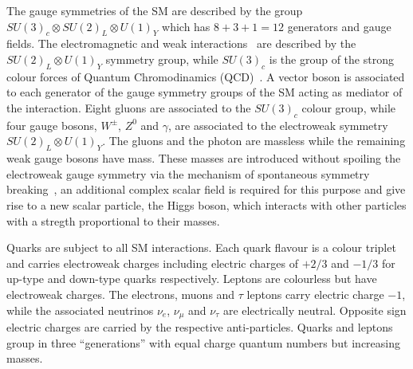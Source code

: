
The gauge  symmetries of the SM are described by the group $SU(3)_c \otimes SU(2)_L \otimes U(1)_Y$ which has $8+3+1=12$
generators and gauge fields. The electromagnetic and weak interactions~\cite{EW1,EW2,EW3}  are described  by the 
$SU(2)_L \otimes U(1)_Y$ symmetry group, while $ SU(3)_c$ is the group of the strong colour forces of Quantum Chromodinamics (QCD)~\cite{qcd1}.
A vector boson is associated to each generator of the gauge symmetry groups of the SM acting as  mediator of the interaction.
Eight gluons are associated to the $ SU(3)_c$ colour group, while  four gauge bosons, $W^{\pm}$,
$Z^0$ and $\gamma$, are associated to the electroweak symmetry $SU(2)_L \otimes U(1)_Y$. 
The gluons and the photon are massless while the remaining weak gauge bosons have mass. 
These masses are introduced without spoiling the electroweak gauge symmetry 
via the mechanism of spontaneous symmetry breaking~\cite{ENGLERT,HIGGS,HIGGS2,HIGGS3,kibble}, an additional complex scalar field is required for this
purpose and give rise to a new scalar particle, the Higgs boson, which interacts with other particles with a stregth proportional to their masses.

Quarks  are subject to all SM interactions. Each quark flavour  is a colour triplet and carries 
electroweak charges including electric charges of $+2/3$ and $-1/3$ for up-type and  down-type quarks respectively.
Leptons are colourless but have electroweak charges. The electrons, muons and $\tau$ leptons carry  electric charge  $-1$,
while the associated neutrinos $\nu_e$, $\nu_{\mu}$ and $\nu_{\tau}$ are electrically neutral. Opposite sign 
electric charges are carried by the respective anti-particles.
Quarks and leptons group in three  ``generations'' with equal charge quantum numbers but increasing masses.

